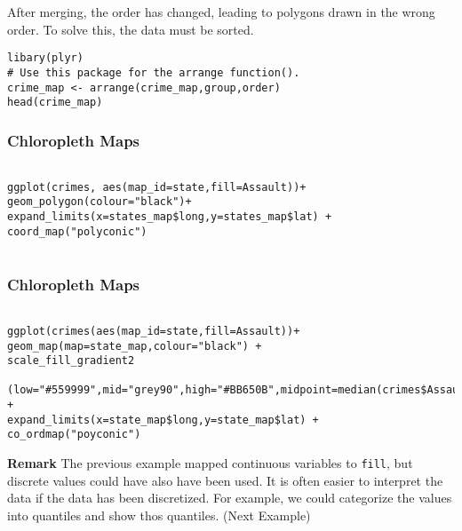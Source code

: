 \documentclass{beamer}
\begin{document}
\begin{frame}[fragile]
After merging, the order has changed, leading to polygons drawn in the wrong order.
To solve this, the data must be sorted.
\begin{framed}
\begin{verbatim}
libary(plyr)
# Use this package for the arrange function().
crime_map <- arrange(crime_map,group,order)
head(crime_map)
\end{verbatim}
\end{framed}
\end{frame}

\begin{frame}[fragile]
\frametitle{Chloropleth Maps}
\begin{framed}
\begin{verbatim}

ggplot(crimes, aes(map_id=state,fill=Assault))+ 
geom_polygon(colour="black")+
expand_limits(x=states_map$long,y=states_map$lat) + 
coord_map("polyconic")


\end{verbatim}
\end{framed}
\end{frame}
\begin{frame}[fragile]
\frametitle{Chloropleth Maps}
\begin{framed}
\begin{verbatim}

ggplot(crimes(aes(map_id=state,fill=Assault))+
geom_map(map=state_map,colour="black") + 
scale_fill_gradient2
   (low="#559999",mid="grey90",high="#BB650B",midpoint=median(crimes$Assault)) +
expand_limits(x=state_map$long,y=state_map$lat) +
co_ordmap("poyconic")

\end{verbatim}
\end{framed}
\end{frame}
\begin{frame}[fragile]
\textbf{Remark}
The previous example mapped continuous variables to \texttt{fill}, but discrete values could have also have been used. 
It is often easier to interpret the data if the data has been discretized.
For example, we could categorize the values into quantiles and show thos quantiles.
(Next Example)



\end{frame}
\end{document}
